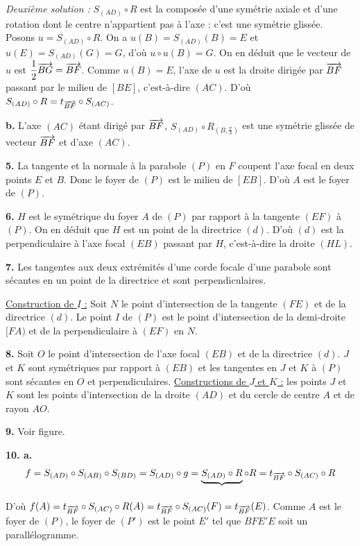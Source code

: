 \documentclass[11pt]{article}
\begin{document}
\emph{Deuxième solution :} $S_{(AD)} \circ R$ est la composée d'une symétrie axiale et d'une rotation dont le centre n'appartient pas à l'axe : c'est une symétrie glissée. Posons $u = S_{(AD)} \circ R$. On a $u(B) = S_{(AD)}(B) = E$ et $u(E) = S_{(AD)}(G) = G$, d'où $u \circ u(B) = G$. On en déduit que le vecteur de $u$ est $\dfrac{1}{2}\overrightarrow{BG} = \overrightarrow{BF}$. Comme $u(B) = E$, l'axe de $u$ est la droite dirigée par $\overrightarrow{BF}$ passant par le milieu de $[BE]$, c'est-à-dire $(AC)$. D'où $S_{(AD)} \circ R = t_{\overrightarrow{BF}} \circ S_{(AC)}$.

\textbf{b.} L'axe $(AC)$ étant dirigé par $\overrightarrow{BF}$, $S_{(AD)} \circ R_{(B,\frac{\pi}{3})}$ est une symétrie glissée de vecteur $\overrightarrow{BF}$ et d'axe $(AC)$.

\textbf{5.} La tangente et la normale à la parabole $(P)$ en $F$ coupent l'axe focal en deux points $E$ et $B$. Donc le foyer de $(P)$ est le milieu de $[EB]$. D'où $A$ est le foyer de $(P)$.

\textbf{6.} $H$ est le symétrique du foyer $A$ de $(P)$ par rapport à la tangente $(EF)$ à $(P)$. On en déduit que $H$ est un point de la directrice $(d)$. D'où $(d)$ est la perpendiculaire à l'axe focal $(EB)$ passant par $H$, c'est-à-dire la droite $(HL)$.

\textbf{7.} Les tangentes aux deux extrémités d'une corde focale d'une parabole sont sécantes en un point de la directrice et sont perpendiculaires.

\underline{Construction de $I$ :} Soit $N$ le point d'intersection de la tangente $(FE)$ et de la directrice $(d)$. Le point $I$ de $(P)$ est le point d'intersection de la demi-droite $[FA)$ et de la perpendiculaire à $(EF)$ en $N$.

\textbf{8.} Soit $O$ le point d'intersection de l'axe focal $(EB)$ et de la directrice $(d)$. $J$ et $K$ sont symétriques par rapport à $(EB)$ et les tangentes en $J$ et $K$ à $(P)$ sont sécantes en $O$ et perpendiculaires. \underline{Constructions de $J$ et $K$ :} les points $J$ et $K$ sont les points d'intersection de la droite $(AD)$ et du cercle de centre $A$ et de rayon $AO$.

\textbf{9.} Voir figure.

\textbf{10. a.}
\begin{align*}
f = S_{(AD)} \circ S_{(AB)} \circ S_{(BD)} = S_{(AD)} \circ g = \underbrace{S_{(AD)} \circ R}_{} \circ R = t_{\overrightarrow{BF}} \circ S_{(AC)} \circ R
\end{align*}
D'où $f(A) = t_{\overrightarrow{BF}} \circ S_{(AC)} \circ R(A) = t_{\overrightarrow{BF}} \circ S_{(AC)}(F) = t_{\overrightarrow{BF}}(E)$. Comme $A$ est le foyer de $(P)$, le foyer de $(P')$ est le point $E'$ tel que $BFE'E$ soit un parallélogramme.
\end{document}
